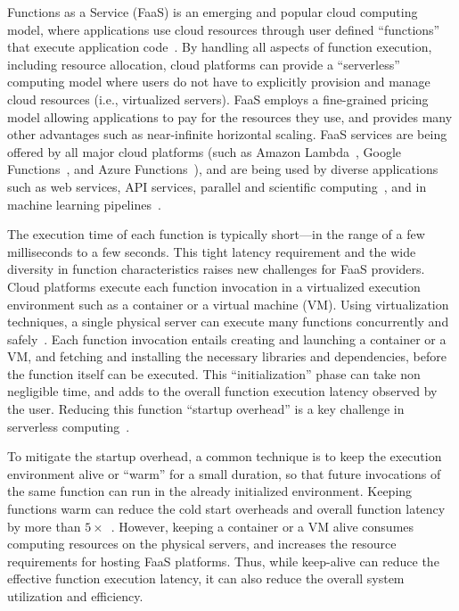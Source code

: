 
Functions as a Service (FaaS) is an emerging and popular cloud computing model, where applications use cloud resources through user defined ``functions'' that execute application code~\cite{jonas2017occupy,jonas_cloud_2019,van_eyk_spec_2017}.
By handling all aspects of function execution, including resource allocation, cloud platforms can  provide a ``serverless'' computing model where users do not have to explicitly provision and manage cloud resources (i.e., virtualized servers).
FaaS employs a fine-grained pricing model allowing applications to pay for the resources they use, and provides many other advantages such as near-infinite horizontal scaling. 
FaaS services are being offered by all major cloud platforms (such as Amazon Lambda~\cite{aws-lambda}, Google Functions~\cite{google-functions}, and Azure Functions~\cite{azure-functions}), and are being used by diverse applications such as web services, API services,  parallel and scientific computing~\cite{funcx_hpdc_20,john_sweep_2019,fouladi_laptop_2019}, and in machine learning pipelines~\cite{carreira2018case, carreira_cirrus_2019}. 


The execution time of each function is typically short---in the range of a few milliseconds to a few seconds.
This tight latency requirement and the wide diversity in function characteristics raises new challenges for FaaS providers. 
Cloud platforms execute each function invocation in a virtualized execution environment such as a container or a virtual machine (VM). %
Using virtualization techniques, a single physical server can execute many functions concurrently and safely~\cite{wang2018peeking}. 
Each function invocation entails creating and launching a container or a VM, and fetching and installing the necessary libraries and dependencies, before the function itself can be executed.
This ``initialization'' phase can take non negligible time, and adds to the overall function execution latency observed by the user. 
Reducing this function ``startup overhead'' is a key challenge in serverless computing~\cite{oakes_sock_2018, hendrickson2016serverless, warm1, warm2}. 


To mitigate the startup overhead, a common technique is to keep the execution environment alive or ``warm'' for a small duration, so that future invocations of the same function can run in the already initialized environment. 
Keeping functions warm can reduce the cold start overheads and overall function latency by more than  $5\times$~\cite{manner_cold_2018}.  
However, keeping a container or a VM alive consumes computing resources on the physical servers, and increases the resource requirements for hosting FaaS platforms. 
Thus, while keep-alive can reduce the effective function execution latency, it can also reduce the overall system utilization and efficiency.



